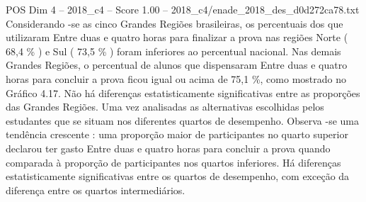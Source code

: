 \begin{textsample}{POS Dim 4 – 2018\_c4 – Score 1.00 – 2018\_c4/enade\_2018\_des\_d0d272ca78.txt}
Considerando -se as cinco Grandes Regiões brasileiras, os percentuais dos que utilizaram Entre duas e quatro horas para finalizar a prova nas regiões Norte ( 68,4 \% ) e Sul ( 73,5 \% ) foram inferiores ao percentual nacional.
Nas demais Grandes Regiões, o percentual de alunos que dispensaram Entre duas e quatro horas para concluir a prova ficou igual ou acima de 75,1 \%, como mostrado no Gráfico 4.17.
Não há diferenças estatisticamente significativas entre as proporções das Grandes Regiões.
Uma vez analisadas as alternativas escolhidas pelos estudantes que se situam nos diferentes quartos de desempenho.
Observa -se uma tendência crescente : uma proporção maior de participantes no quarto superior declarou ter gasto Entre duas e quatro horas para concluir a prova quando comparada à proporção de participantes nos quartos inferiores.
Há diferenças estatisticamente significativas entre os quartos de desempenho, com exceção da diferença entre os quartos intermediários.

\end{textsample}
